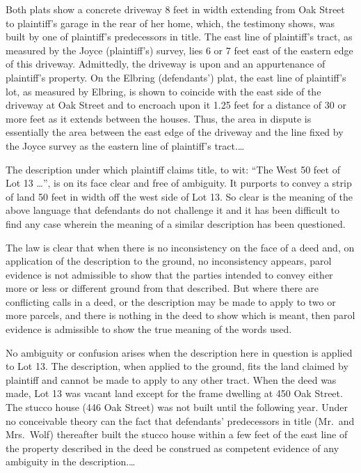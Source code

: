 Both plats show a concrete driveway 8 feet in width extending from Oak Street to
plaintiff's garage in the rear of her home, which, the testimony shows, was
built by one of plaintiff's predecessors in title. The east line of plaintiff's
tract, as measured by the Joyce (plaintiff's) survey, lies 6 or 7 feet east of
the eastern edge of this driveway. Admittedly, the driveway is upon and an
appurtenance of plaintiff's property. On the Elbring (defendants') plat, the
east line of plaintiff's lot, as measured by Elbring, is shown to coincide with
the east side of the driveway at Oak Street and to encroach upon it 1.25 feet
for a distance of 30 or more feet as it extends between the houses. Thus, the
area in dispute is essentially the area between the east edge of the driveway
and the line fixed by the Joyce survey as the eastern line of plaintiff's
tract.\ldots

The description under which plaintiff claims title, to wit: ``The West 50 feet
of
Lot 13 \dots'', is on its face clear and free of ambiguity. It purports to
convey a strip of land 50 feet in width off the west side of Lot 13. So clear
is the meaning of the above language that defendants do not challenge it and it
has been difficult to find any case wherein the meaning of a similar
description has been questioned. 

The law is clear that when there is no inconsistency on the face of a deed and,
on application of the description to the ground, no inconsistency appears,
parol evidence is not admissible to show that the parties intended to convey
either more or less or different ground from that described. But where there
are conflicting calls in a deed, or the description may be made to apply to two
or more parcels, and there is nothing in the deed to show which is meant, then
parol evidence is admissible to show the true meaning of the words used. 

No ambiguity or confusion arises when the description here in question is
applied to Lot 13. The description, when applied to the ground, fits the land
claimed by plaintiff and cannot be made to apply to any other tract. When the
deed was made, Lot 13 was vacant land except for the frame dwelling at 450 Oak
Street. The stucco house (446 Oak Street) was not built until the following
year. Under no conceivable theory can the fact that defendants' predecessors in
title (Mr.~and Mrs.~Wolf) thereafter built the stucco house within a few feet
of the east line of the property described in the deed be construed as
competent evidence of any ambiguity in the description.\ldots

